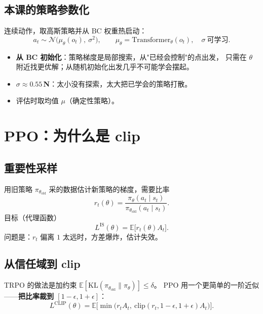 \subsection{本课的策略参数化}

连续动作，取高斯策略并从 BC 权重热启动：
\begin{equation}
  a_t\sim\mathcal{N}\big(\mu_\theta(o_t),\ \sigma^2\big),\qquad
  \mu_\theta=\text{Transformer}_\theta(o_t),\quad \sigma\ \text{可学习}.
\end{equation}
\begin{itemize}[leftmargin=2em,itemsep=2pt]
  \item \textbf{从 BC 初始化}：策略梯度是局部搜索，从"已经会控制"的点出发，
        只需在 $\theta$ 附近找更优解；从随机初始化出发几乎不可能学会摆起。
  \item \textbf{$\sigma\approx0.55$\,N}：太小没有探索，太大把已学会的策略打散。
  \item 评估时取均值 $\mu$（确定性策略）。
\end{itemize}

\section{PPO：为什么是 clip}

\subsection{重要性采样}

用旧策略 $\pi_{\theta_{\text{old}}}$ 采的数据估计新策略的梯度，需要比率
\begin{equation}
  r_t(\theta)=\frac{\pi_\theta(a_t\mid s_t)}{\pi_{\theta_{\text{old}}}(a_t\mid s_t)} .
\end{equation}
目标（代理函数）
\begin{equation}
  L^{\text{IS}}(\theta)=\mathbb{E}\big[r_t(\theta)A_t\big].
\end{equation}
问题是：$r_t$ 偏离 $1$ 太远时，方差爆炸，估计失效。

\subsection{从信任域到 clip}

TRPO 的做法是加约束 $\mathbb{E}[\mathrm{KL}(\pi_{\theta_{\text{old}}}\|\pi_\theta)]\le\delta$。
PPO 用一个更简单的一阶近似——\textbf{把比率裁到 $[1-\epsilon,1+\epsilon]$}：
\begin{equation}
  L^{\text{CLIP}}(\theta)=\mathbb{E}\Big[\min\big(r_tA_t,\
  \mathrm{clip}(r_t,1-\epsilon,1+\epsilon)A_t\big)\Big].
  \label{eq:clip}
\end{equation}

